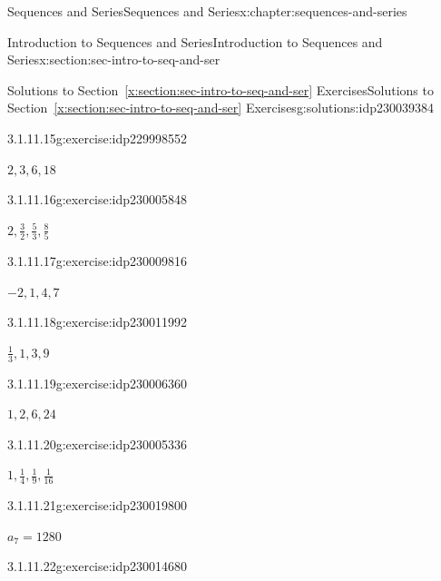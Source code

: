 \documentclass[twoside,10pt,]{book}
\newcommand{\xreffont}{\relax}
\numberwithin{equation}{section}
\begin{document}
\begin{chapterptx}{Sequences and Series}{}{Sequences and Series}{}{}{x:chapter:sequences-and-series}
\begin{sectionptx}{Introduction to Sequences and Series}{}{Introduction to Sequences and Series}{}{}{x:section:sec-intro-to-seq-and-ser}
\begin{solutions-subsection}{Solutions to Section~{\xreffont\ref*{x:section:sec-intro-to-seq-and-ser}} Exercises}{}{Solutions to Section~{\xreffont\ref*{x:section:sec-intro-to-seq-and-ser}} Exercises}{}{}{g:solutions:idp230039384}
\begin{exercisegroup}
\begin{divisionsolutioneg}{3.1.11.15}{}{g:exercise:idp229998552}%
\par\smallskip%
\noindent\hypertarget{g:solution:idp230011352-main}{}\(2, 3, 6, 18\)\end{divisionsolutioneg}%
\begin{divisionsolutioneg}{3.1.11.16}{}{g:exercise:idp230005848}%
\par\smallskip%
\noindent\hypertarget{g:solution:idp230013016-main}{}\(2,\frac{3}{2},\frac{5}{3},\frac{8}{5}\)\end{divisionsolutioneg}%
\end{exercisegroup}
\par\medskip\noindent
\begin{exercisegroup}
\begin{divisionsolutioneg}{3.1.11.17}{}{g:exercise:idp230009816}%
\par\smallskip%
\noindent\hypertarget{g:solution:idp230010328-main}{}\(-2, 1, 4, 7\)\end{divisionsolutioneg}%
\begin{divisionsolutioneg}{3.1.11.18}{}{g:exercise:idp230011992}%
\par\smallskip%
\noindent\hypertarget{g:solution:idp230008152-main}{}\(\frac{1}{3},1,3,9\)\end{divisionsolutioneg}%
\begin{divisionsolutioneg}{3.1.11.19}{}{g:exercise:idp230006360}%
\par\smallskip%
\noindent\hypertarget{g:solution:idp230007128-main}{}\(1, 2, 6, 24\)\end{divisionsolutioneg}%
\begin{divisionsolutioneg}{3.1.11.20}{}{g:exercise:idp230005336}%
\par\smallskip%
\noindent\hypertarget{g:solution:idp230005464-main}{}\(1,\frac{1}{4},\frac{1}{9},\frac{1}{16}\)\end{divisionsolutioneg}%
\end{exercisegroup}
\par\medskip\noindent
\begin{exercisegroup}
\begin{divisionsolutioneg}{3.1.11.21}{}{g:exercise:idp230019800}%
\par\smallskip%
\noindent\hypertarget{g:solution:idp230017112-main}{}\(a_7 = 1280\)\end{divisionsolutioneg}%
\begin{divisionsolutioneg}{3.1.11.22}{}{g:exercise:idp230014680}%

\end{divisionsolutioneg}
\end{exercisegroup}
\end{solutions-subsection}
\end{sectionptx}
\end{chapterptx}
\end{document}
